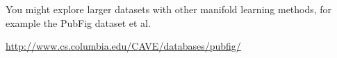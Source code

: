 \documentclass[11pt]{article}
\def\R{{\mathbb R}}
\def\diag{{\mathrm{diag}}}
\begin{document}
You might explore larger datasets with other manifold learning methods, for example the PubFig dataset et al.

\url{http://www.cs.columbia.edu/CAVE/databases/pubfig/}


%
\end{document}

